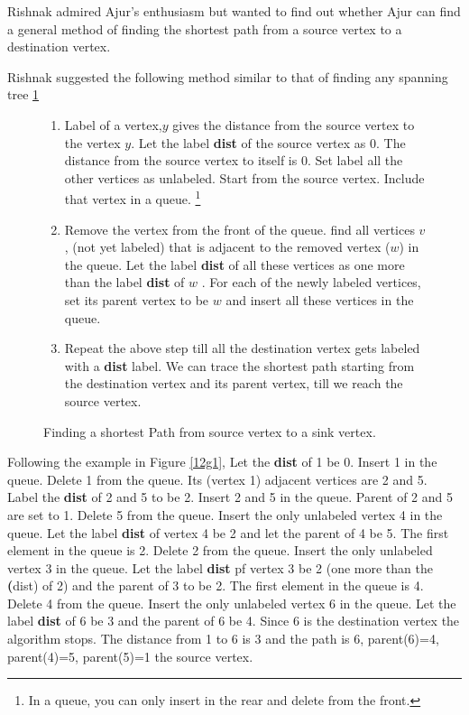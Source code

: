 Rishnak admired Ajur's enthusiasm but wanted to find out whether Ajur can find a general method of finding the shortest path from a source vertex to a destination vertex.

Rishnak suggested the following method similar to that of finding any spanning tree \ref{12a1}

\begin{figure} 
\begin{enumerate}
\item  Label of a vertex,$y$ gives the distance from the source vertex to the vertex $y$.  Let the label \textbf{dist} of the source vertex as 0. The distance from the source vertex to itself is 0. Set label all the other vertices as unlabeled. Start from the source vertex. Include that vertex in a queue. \footnote{ In a queue, you can only insert in the rear and delete from the front.} 
\item Remove the vertex from the front of the queue. find all vertices $v$, (not yet labeled) that is adjacent to the removed vertex ($w$) in the queue. Let the label \textbf{dist} of all these vertices as one more than the label \textbf{dist} of $w$ . For each of the newly labeled vertices, set its parent vertex to be $w$ and insert all these vertices in the queue.
\item Repeat the above step till all the destination vertex gets labeled with a \textbf{dist} label. We can trace the shortest path starting from the destination vertex and its parent vertex, till we reach the source vertex.
\end{enumerate}
\caption{Finding a shortest Path from source vertex to a sink vertex.}\label{12a1}
\end{figure}

Following the example in Figure \ref{12g1}, Let the \textbf{dist} of 1 be 0. Insert 1 in the queue. Delete 1 from the queue. Its (vertex 1) adjacent vertices are 2 and 5. Label the \textbf{dist} of 2 and 5 to be 2. Insert 2 and 5 in the queue. Parent of 2 and 5 are set  to 1. Delete 5 from the queue. Insert the only unlabeled vertex 4 in the queue. Let the label \textbf{dist} of vertex 4 be 2 and let the parent of 4 be 5. The first element in the queue is 2. Delete 2 from the queue. Insert the only unlabeled vertex 3 in the queue.  Let the label \textbf{dist} pf vertex 3 be 2 (one more than the \textbf(dist) of 2) and the parent of 3 to be 2. The first element in the queue is 4. Delete 4 from the queue. Insert the only unlabeled vertex 6 in the queue. Let the label \textbf{dist} of 6 be 3 and the parent of 6 be 4. Since 6 is the destination vertex the algorithm stops. The distance from 1 to 6 is 3 and the path is 6, parent(6)=4, parent(4)=5, parent(5)=1 the source vertex.

